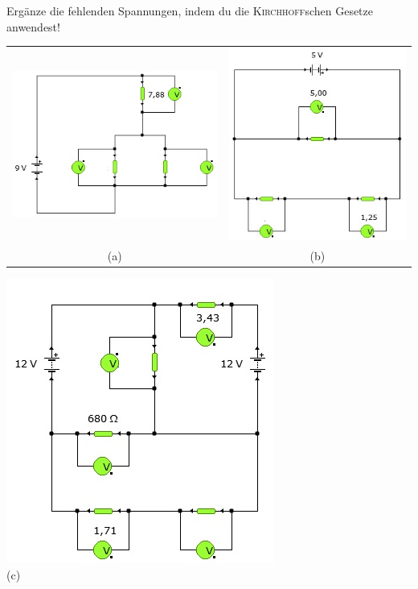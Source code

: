 \begin{Aufgabe} \label{Aufg:Kirchhoff2}
Ergänze die fehlenden Spannungen, indem du die \textsc{Kirchhoff}schen Gesetze anwendest!

\begin{tabular}{cc}
\includegraphics[scale=.8]{pics/Masche1}
&
\includegraphics[scale=.8]{pics/Masche2}
\\
(a) & (b)
\end{tabular}
\centering
\includegraphics[scale=.9]{pics/Masche3}
\\
(c)
\end{Aufgabe}



